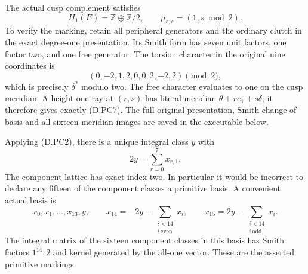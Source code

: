 The actual cusp complement satisfies
\[
 H_1(E)=\mathbb Z\oplus\mathbb Z/2,
                      \qquad \mu_{r,s}=(1,s\bmod2).      \tag{D.PC7}
\]
To verify the marking, retain all peripheral generators and the
ordinary clutch in the exact degree-one presentation. Its Smith
form has seven unit factors, one factor two, and one free generator.
The torsion character in the original nine coordinates is
\[
                  (0,-2,1,2,0,0,2,-2,2)\pmod2,
                                                               \tag{D.PC8}
\]
which is precisely $\delta^*$ modulo two. The free character
evaluates to one on the cusp meridian. A height-one ray at
$(r,s)$ has literal meridian $\theta+r e_1+s\delta$; it
therefore gives exactly (D.PC7). The full original presentation,
Smith change of basis and all sixteen meridian images are saved
in the executable below.

Applying (D.PC2), there is a unique integral class $y$ with
\[
                    2y=\sum_{r=0}^{7}x_{r,1}.             \tag{D.PC9}
\]
The component lattice has exact index two. In particular it would
be incorrect to declare any fifteen of the component classes a
primitive basis. A convenient actual basis is
\[
 x_0,x_1,\ldots,x_{13},y,\qquad
 x_{14}=-2y-\sum_{\substack{i<14\\i\ \mathrm{even}}}x_i,
 \qquad
 x_{15}=2y-\sum_{\substack{i<14\\i\ \mathrm{odd}}}x_i.
                                                               \tag{D.PC10}
\]
The integral matrix of the sixteen component classes in this basis
has Smith factors $1^{14},2$ and kernel generated by the all-one
vector. These are the asserted primitive markings.

